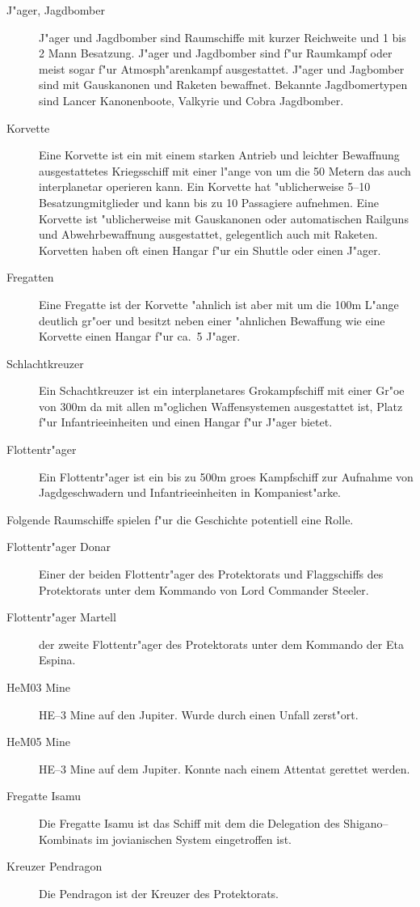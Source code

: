 \begin{appendices}
\begin{description}
\item [J"ager, Jagdbomber] J"ager und Jagdbomber sind Raumschiffe mit kurzer Reichweite und 1 bis 2 Mann Besatzung.
      J"ager und Jagdbomber sind f"ur Raumkampf oder meist sogar f"ur Atmosph"arenkampf ausgestattet. J"ager und Jagbomber sind mit Gauskanonen und Raketen bewaffnet. Bekannte Jagdbomertypen sind Lancer Kanonenboote, Valkyrie  und Cobra Jagdbomber.
\item [Korvette] Eine Korvette ist ein mit einem starken Antrieb und leichter Bewaffnung ausgestattetes Kriegsschiff
      mit einer l"ange von um die 50 Metern das auch interplanetar operieren kann. Ein Korvette hat "ublicherweise 5--10 Besatzungmitglieder und kann bis zu 10 Passagiere aufnehmen. Eine Korvette ist "ublicherweise mit Gauskanonen oder automatischen Railguns und Abwehrbewaffnung ausgestattet, gelegentlich auch mit Raketen. Korvetten haben oft einen Hangar f"ur ein Shuttle oder einen J"ager.
\item [Fregatten] Eine Fregatte ist der Korvette "ahnlich ist aber mit um die 100m L"ange deutlich gr"o\3er und besitzt
      neben einer "ahnlichen Bewaffung wie eine Korvette einen Hangar f"ur ca.~5 J"ager.
\item [Schlachtkreuzer] Ein Schachtkreuzer ist ein interplanetares Gro\3kampfschiff mit einer Gr"o\3e von 300m da\3 mit allen m"oglichen Waffensystemen ausgestattet ist, Platz f"ur Infantrieeinheiten und einen Hangar f"ur J"ager bietet.
\item [Flottentr"ager] Ein Flottentr"ager ist ein bis zu 500m gro\3es Kampfschiff zur Aufnahme von
      Jagdgeschwadern und Infantrieeinheiten in Kompaniest"arke.
\end{description}

Folgende Raumschiffe spielen f"ur die Geschichte potentiell eine Rolle.

\begin{description}
\item [Flottentr"ager Donar] Einer der beiden Flottentr"ager des Protektorats und Flaggschiffs des Protektorats unter
       dem Kommando von Lord Commander Steeler.
\item [Flottentr"ager Martell] der zweite Flottentr"ager des Protektorats unter dem Kommando der Eta Espina.
\item [HeM03 Mine] HE--3 Mine auf den Jupiter. Wurde durch einen Unfall zerst"ort.
\item [HeM05 Mine] HE--3 Mine auf dem Jupiter. Konnte nach einem Attentat gerettet werden.
\item [Fregatte Isamu] Die Fregatte Isamu ist das Schiff mit dem die Delegation des Shigano--Kombinats im jovianischen
      System eingetroffen ist.
\item [Kreuzer Pendragon] Die Pendragon ist der Kreuzer des Protektorats.
\end{description}


\end{appendices}
